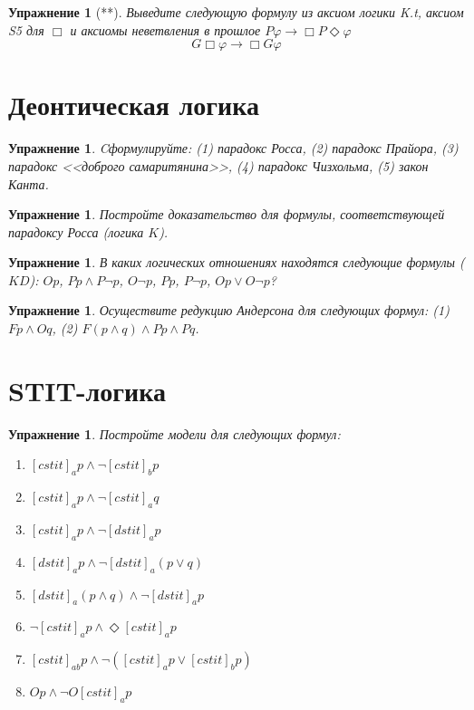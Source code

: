 \documentclass[11pt]{article}
\newtheorem{exercise}[theorem]{Упражнение}
\begin{document}
\begin{exercise}[**] Выведите следующую формулу из аксиом логики K.t, аксиом S5 для $\Box$ и аксиомы неветвления в прошлое $P \varphi \to \Box P \Diamond \varphi$
$$G \Box \varphi \to \Box G \varphi$$

\end{exercise}

\section{Деонтическая логика}
\begin{exercise} Cформулируйте:
(1) парадокс Росса,
(2) парадокс Прайора,
(3) парадокс <<доброго самаритянина>>,
(4) парадокс Чизхольма,
(5) закон Канта.
\end{exercise}

\begin{exercise} Постройте доказательство для формулы, соответствующей парадоксу Росса (логика $K$).
\end{exercise}

\begin{exercise} В каких логических отношениях находятся следующие формулы ($KD$): $Op$, $Pp \wedge P \neg p $, $O \neg p$, $Pp$, $P \neg p$, $Op \vee O \neg p$?
\end{exercise}

\begin{exercise} Осуществите редукцию Андерсона для следующих формул: (1) $Fp \wedge O q$, (2) $F (p \wedge q) \wedge Pp \wedge Pq$.	
\end{exercise}

\section{STIT-логика}
\begin{exercise} Постройте модели для следующих формул:
\begin{multicols}{1}
\begin{enumerate}
	\item $[cstit]_a p \wedge \neg [cstit]_b p$
	\item $[cstit]_a p \wedge \neg [cstit]_a q$
	\item $[cstit]_a p \wedge \neg [dstit]_a p$
	\item $[dstit]_a p \wedge \neg [dstit]_a (p \vee q)$
    \item $[dstit]_a (p \wedge q) \wedge \neg [dstit]_a p$
	\item $\neg [cstit]_a p \wedge \Diamond [cstit]_a p $
    \item $[cstit]_{ab} p \wedge \neg ([cstit]_a p \vee [cstit]_b p) $
    \item $Op \wedge \neg O [cstit]_a p $
\end{enumerate}
\end{multicols}

\end{exercise}
\end{document}
